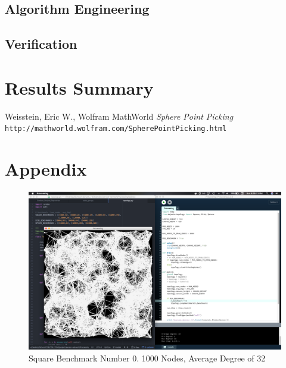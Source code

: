 \documentclass{article}
\begin{document}

    \subsection{Algorithm Engineering}

    \subsection{Verification}


\section{Results Summary}

\newpage

\begin{thebibliography}{10}
    Weisstein, Eric W., Wolfram MathWorld
    \textit{Sphere Point Picking}
    \texttt{http://mathworld.wolfram.com/SpherePointPicking.html}

\end{thebibliography}

\newpage

\section{Appendix}

\begin{center}
    \begin{figure}
        \includegraphics[scale=0.25]{./images/square_0.png}
        \caption{Square Benchmark Number 0. 1000 Nodes, Average Degree of 32}
        \label{square0}
    \end{figure}
\end{center}
\end{document}
